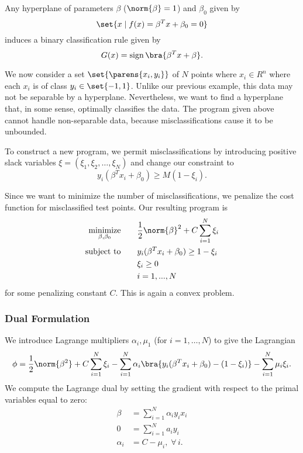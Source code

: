 \documentclass[10pt]{article}
\begin{document}
Any hyperplane of parameters $\beta$ ($\norm{\beta}=1$) and $\beta_{0}$ given by
\[
	\set{x \;|\; f(x)={\beta^{T}x+\beta_{0}}=0}
\]
induces a binary classification rule given by
\[
	G(x)=\operatorname{sign}\bra{\beta^{T}x+\beta}.
\]

We now consider a set $\set{\parens{x_{i},y_{i}}}$ of $N$ points where $x_{i}\in R^{n}$ where each $x_{i}$ is of class $y_{i}\in\set{-1,1}$. Unlike our previous example, this data may not be separable by a hyperplane. Nevertheless, we want to find a hyperplane that, in some sense, optimally classifies the data. The program given above cannot handle non-separable data, because misclassifications cause it to be unbounded.

To construct a new program, we permit misclassifications by introducing positive slack variables $\xi=(\xi_{1},\xi_{2},\ldots,\xi_{N})$ and change our constraint to
\[
	y_{i}(\beta^{T}x_{i}+\beta_{0})\geq M(1-\xi_{i}).
\]

Since we want to minimize the number of misclassifications, we penalize the cost function for misclassified test points. Our resulting program is
\begin{align*}
	\operatorname*{minimize}_{\beta,\beta_{0}}\qquad &
	 	\frac{1}{2}\norm{\beta}^{2} +C\sum_{i=1}^{N}\xi_{i}\\
	\text{subject to}\qquad & 	y_{i}(\beta^{T}x_{i}+\beta_{0})\geq 1-\xi_{i} \\
	&\xi_{i}\geq 0\\
	&i=1,...,N
\end{align*}
for some penalizing constant $C$. This is again a convex problem.

\subsubsection{Dual Formulation} %
\label{ssub:dual_formulation}

We introduce Lagrange multipliers $\alpha_{i}, \mu_{1}$ (for $i=1,\ldots,N$) to give the Lagrangian
\[
	\phi=
		\frac{1}{2}\norm{\beta^{2}}
		+C\sum_{i=1}^{N}\xi_{i}
		-\sum_{i=1}^{N}\alpha_{i}
			\bra{	y_{i}(\beta^{T}x_{i}+\beta_{0})-(1-\xi_{i})}
		-\sum_{i=1}^{N}\mu_{i}\xi_{i}.
\]
We compute the Lagrange dual by setting the gradient with respect to the primal variables equal to zero:
\begin{align}
	\beta&=\sum_{i=1}^{N}\alpha_{i}y_{i}x_{i} \label{eq:dual_con_3}\\
	0&=\sum_{i=1}^{N}a_{i}y_{i} \label{eq:dual_con_1}\\
	\alpha_{i}&=C-\mu_{i}, \;\forall\, i.\label{eq:dual_con_2}
\end{align}
\end{document}
